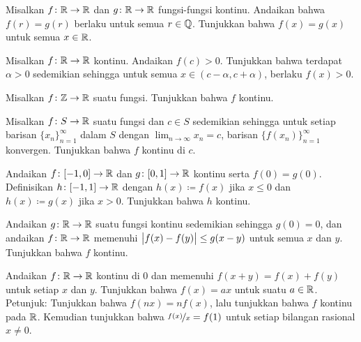 \begin{exercise}
Misalkan $f \colon {\mathbb{R}} \to {\mathbb{R}}$ dan 
$g \colon {\mathbb{R}} \to {\mathbb{R}}$ fungsi-fungsi kontinu.  Andaikan bahwa
$f(r) = g(r)$ berlaku untuk semua $r \in {\mathbb{Q}}$.
Tunjukkan bahwa $f(x) = g(x)$ untuk semua $x \in {\mathbb{R}}$.
\end{exercise}

\begin{exercise} \label{exercise:positivecontneigh}
Misalkan $f \colon {\mathbb{R}} \to {\mathbb{R}}$ kontinu.  Andaikan $f(c) > 0$.  Tunjukkan bahwa
terdapat $\alpha > 0$ sedemikian sehingga untuk semua $x \in (c-\alpha,c+\alpha)$,
berlaku $f(x) > 0$.
\end{exercise}

\begin{exercise}
Misalkan $f \colon {\mathbb{Z}} \to {\mathbb{R}}$ suatu fungsi.  Tunjukkan bahwa $f$ kontinu.
\end{exercise}

\begin{exercise} \label{exercise:contseqalt}
Misalkan $f \colon S \to {\mathbb{R}}$ suatu fungsi dan $c \in S$ sedemikian sehingga untuk setiap
barisan $\{ x_n \}_{n=1}^\infty$ dalam $S$ dengan $\lim_{n\to\infty} x_n = c$, barisan
$\bigl\{ f(x_n) \bigr\}_{n=1}^\infty$ konvergen.  Tunjukkan bahwa $f$ kontinu di $c$.
\end{exercise}

\begin{exercise}
Andaikan $f \colon [-1,0] \to {\mathbb{R}}$ dan $g \colon [0,1] \to {\mathbb{R}}$ kontinu
serta $f(0) = g(0)$.  Definisikan $h \colon [-1,1] \to {\mathbb{R}}$ dengan 
$h(x) \coloneqq f(x)$ jika $x \leq 0$ dan $h(x) \coloneqq g(x)$ jika $x > 0$.  Tunjukkan bahwa
$h$ kontinu.
\end{exercise}

\begin{exercise}
Andaikan $g \colon {\mathbb{R}} \to {\mathbb{R}}$ suatu fungsi kontinu sedemikian sehingga $g(0) = 0$,
dan andaikan $f \colon {\mathbb{R}} \to {\mathbb{R}}$ memenuhi
$\bigl\lvert {f(x)-f(y)} \bigr\rvert \leq g(x-y)$ untuk semua $x$ dan $y$.  Tunjukkan bahwa $f$
kontinu.
\end{exercise}

\begin{exercise}[Menantang]
Andaikan $f \colon {\mathbb{R}} \to {\mathbb{R}}$ kontinu di $0$ dan
memenuhi $f(x+y) = f(x) + f(y)$ untuk setiap $x$ dan $y$.
Tunjukkan bahwa $f(x) = ax$ untuk suatu $a \in {\mathbb{R}}$.
Petunjuk: Tunjukkan bahwa $f(nx) = nf(x)$, lalu tunjukkan bahwa $f$ kontinu pada ${\mathbb{R}}$.
Kemudian tunjukkan bahwa $\nicefrac{f(x)}{x} = f(1)$ untuk setiap bilangan rasional $x \neq 0$.
\end{exercise}

